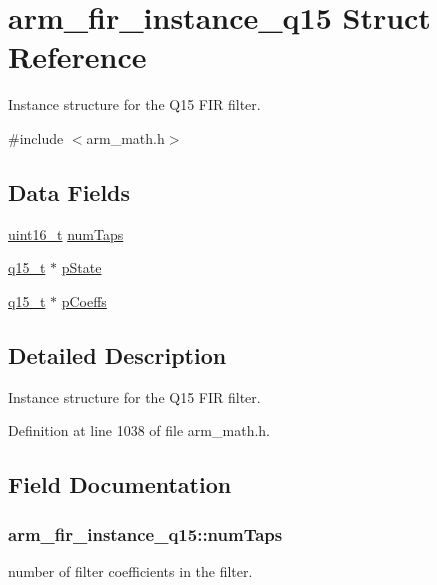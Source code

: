 \hypertarget{structarm__fir__instance__q15}{\section{arm\-\_\-fir\-\_\-instance\-\_\-q15 Struct Reference}
\label{structarm__fir__instance__q15}
}


Instance structure for the Q15 F\-I\-R filter.  




{\ttfamily \#include $<$arm\-\_\-math.\-h$>$}

\subsection*{Data Fields}
\begin{DoxyCompactItemize}
\item 
\hyperlink{stdint_8h_a273cf69d639a59973b6019625df33e30}{uint16\-\_\-t} \hyperlink{structarm__fir__instance__q15_a0e46f93cf51bfb18b1be808be9c5bfc9}{num\-Taps}
\item 
\hyperlink{arm__math_8h_ab5a8fb21a5b3b983d5f54f31614052ea}{q15\-\_\-t} $\ast$ \hyperlink{structarm__fir__instance__q15_aa8d25f44f45b6a6c4cf38c31569b8a01}{p\-State}
\item 
\hyperlink{arm__math_8h_ab5a8fb21a5b3b983d5f54f31614052ea}{q15\-\_\-t} $\ast$ \hyperlink{structarm__fir__instance__q15_a6d16db16a5f8f0db54938f2967244d9e}{p\-Coeffs}
\end{DoxyCompactItemize}


\subsection{Detailed Description}
Instance structure for the Q15 F\-I\-R filter. 

Definition at line 1038 of file arm\-\_\-math.\-h.



\subsection{Field Documentation}
\hypertarget{structarm__fir__instance__q15_a0e46f93cf51bfb18b1be808be9c5bfc9}{
\subsubsection[{num\-Taps}]{ arm\-\_\-fir\-\_\-instance\-\_\-q15\-::num\-Taps}}\label{structarm__fir__instance__q15_a0e46f93cf51bfb18b1be808be9c5bfc9}
number of filter coefficients in the filter. 

